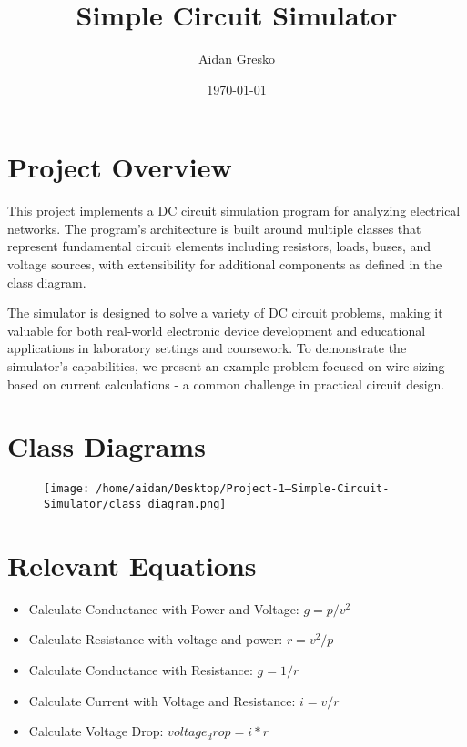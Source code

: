 \documentclass{article}
\title{Simple Circuit Simulator}
\date{\today}
\author{Aidan Gresko}
\begin{document}
	\maketitle
	
	\section{Project Overview}
	This project implements a DC circuit simulation program for analyzing electrical networks. The program's architecture is built around multiple classes that represent fundamental circuit elements including resistors, loads, buses, and voltage sources, with extensibility for additional components as defined in the class diagram.	
	\vspace{10pt}
	
	\noindent
	The simulator is designed to solve a variety of DC circuit problems, making it valuable for both real-world electronic device development and educational applications in laboratory settings and coursework. To demonstrate the simulator's capabilities, we present an example problem focused on wire sizing based on current calculations - a common challenge in practical circuit design.	
	\newpage
	\section{Class Diagrams}
	\begin{figure}[h]
		\centering
		\texttt{[image: /home/aidan/Desktop/Project-1---Simple-Circuit-Simulator/class\_diagram.png]}		
	\end{figure}
	
	\section{Relevant Equations}
	\begin{itemize}
		\item Calculate Conductance with Power and Voltage: $g = p / v^2$
		\item Calculate Resistance with voltage and power: $r = v^2 / p$
		\item Calculate Conductance with Resistance: $g = 1 / r$
		\item Calculate Current with Voltage and Resistance: $i = v / r$
		\item Calculate Voltage Drop: $voltage_drop = i * r$
		
	\end{itemize}
	
\end{document}
